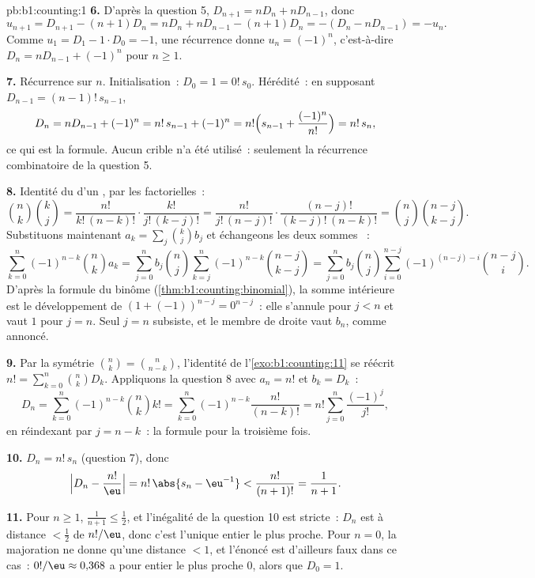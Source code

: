 \begin{solution}{pb:b1:counting:1}
\textbf{6.} D'après la question 5, $D_{n+1} = nD_n + nD_{n-1}$, donc
\[
u_{n+1} = D_{n+1} - (n+1)D_n = nD_n + nD_{n-1} - (n+1)D_n
= -(D_n - nD_{n-1}) = -u_n .
\]
Comme $u_1 = D_1 - 1 \cdot D_0 = -1$, une récurrence donne $u_n =
(-1)^n$, c'est-à-dire $D_n = nD_{n-1} + (-1)^n$ pour $n \geq 1$.

\textbf{7.} Récurrence sur $n$. Initialisation~: $D_0 = 1 = 0!\,s_0$.
Hérédité~: en supposant $D_{n-1} = (n-1)!\,s_{n-1}$,
\[
D_n = nD_{n-1} + (-1)^n = n!\,s_{n-1} + (-1)^n
= n!\Bigl(s_{n-1} + \frac{(-1)^n}{n!}\Bigr) = n!\,s_n ,
\]
ce qui est la formule. Aucun crible n'a été utilisé~: seulement la
récurrence combinatoire de la question 5.

\textbf{8.} Identité du  d'un , par les
factorielles~:
\[
\binom nk \binom kj
= \frac{n!}{k!\,(n-k)!} \cdot \frac{k!}{j!\,(k-j)!}
= \frac{n!}{j!\,(n-j)!} \cdot \frac{(n-j)!}{(k-j)!\,(n-k)!}
= \binom nj \binom{n-j}{k-j} .
\]
Substituons maintenant $a_k = \sum_j \binom kj b_j$ et échangeons les deux
sommes ~:
\[
\sum_{k=0}^{n} (-1)^{n-k} \binom nk a_k
= \sum_{j=0}^{n} b_j \binom nj
\sum_{k=j}^{n} (-1)^{n-k} \binom{n-j}{k-j}
= \sum_{j=0}^{n} b_j \binom nj
\sum_{i=0}^{n-j} (-1)^{(n-j)-i} \binom{n-j}{i} .
\]
D'après la formule du binôme (\cref{thm:b1:counting:binomial}), la somme
intérieure est le développement de $(1 + (-1))^{n-j} = 0^{n-j}$~: elle
s'annule pour $j < n$ et vaut $1$ pour $j = n$. Seul $j = n$ subsiste, et
le membre de droite vaut $b_n$, comme annoncé.

\textbf{9.} Par la symétrie $\binom nk = \binom n{n-k}$, l'identité
de l'\cref{exo:b1:counting:11} se réécrit $n! =
\sum_{k=0}^n \binom nk D_k$. Appliquons la question 8 avec $a_n = n!$ et
$b_k = D_k$~:
\[
D_n = \sum_{k=0}^{n} (-1)^{n-k} \binom nk k!
= \sum_{k=0}^{n} (-1)^{n-k} \frac{n!}{(n-k)!}
= n! \sum_{j=0}^{n} \frac{(-1)^j}{j!} ,
\]
en réindexant par $j = n - k$~: la formule pour la troisième fois.

\textbf{10.} $D_n = n!\,s_n$ (question 7), donc
\[
\Bigl| D_n - \frac{n!}{\eu} \Bigr|
= n!\,\abs{s_n - \eu^{-1}} < \frac{n!}{(n+1)!} = \frac1{n+1} .
\]

\textbf{11.} Pour $n \geq 1$, $\frac1{n+1} \leq \frac12$, et
l'inégalité de la question 10 est stricte~: $D_n$ est à distance
$< \frac12$ de $n!/\eu$, donc c'est l'unique entier le plus proche. Pour
$n = 0$, la majoration ne donne qu'une distance $< 1$, et l'énoncé est
d'ailleurs faux dans ce cas~: $0!/\eu \approx 0{,}368$ a pour entier le plus
proche $0$, alors que $D_0 = 1$.


\end{solution}
